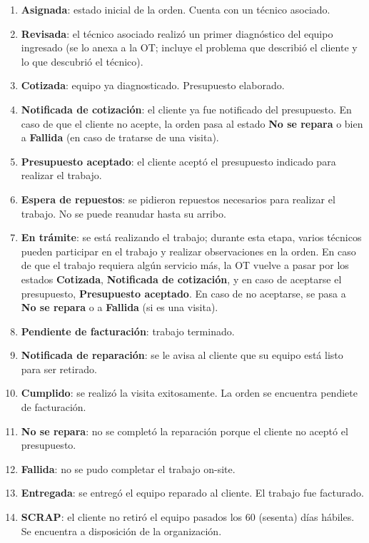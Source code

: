 \documentclass[12pt]{extarticle}
\begin{document}
    \begin{enumerate}
        \item \textbf{Asignada}: estado inicial de la orden. Cuenta con un técnico asociado.
        \item \textbf{Revisada}: el técnico asociado realizó un primer diagnóstico del equipo ingresado (se lo anexa a la OT; incluye el problema que describió el cliente y lo que descubrió el técnico).
        \item \textbf{Cotizada}: equipo ya diagnosticado. Presupuesto elaborado.
        \item \textbf{Notificada de cotización}: el cliente ya fue notificado del presupuesto. En caso de que el cliente no acepte, la orden pasa al estado \textbf{No se repara} o bien a \textbf{Fallida} (en caso de tratarse de una visita). 
        \item \textbf{Presupuesto aceptado}: el cliente aceptó el presupuesto indicado para realizar el trabajo.
        \item \textbf{Espera de repuestos}: se pidieron repuestos necesarios para realizar el trabajo. No se puede reanudar hasta su arribo.
        \item \textbf{En trámite}: se está realizando el trabajo; durante esta etapa, varios técnicos pueden participar en el trabajo y realizar observaciones en la orden. En caso de que el trabajo requiera algún servicio más, la OT vuelve a pasar por los estados \textbf{Cotizada}, \textbf{Notificada de cotización}, y en caso de aceptarse el presupuesto, \textbf{Presupuesto aceptado}. En caso de no aceptarse, se pasa a \textbf{No se repara} o a \textbf{Fallida} (si es una visita).
        \item \textbf{Pendiente de facturación}: trabajo terminado. 
        \item \textbf{Notificada de reparación}: se le avisa al cliente que su equipo está listo para ser retirado.
        \item \textbf{Cumplido}: se realizó la visita exitosamente. La orden se encuentra pendiete de facturación.
        \item \textbf{No se repara}: no se completó la reparación porque el cliente no aceptó el presupuesto.
        \item \textbf{Fallida}: no se pudo completar el trabajo on-site.
        \item \textbf{Entregada}: se entregó el equipo reparado al cliente. El trabajo fue facturado.
        \item \textbf{SCRAP}: el cliente no retiró el equipo pasados los 60 (sesenta) días hábiles. Se encuentra a disposición de la organización.
    \end{enumerate}
\end{document}
